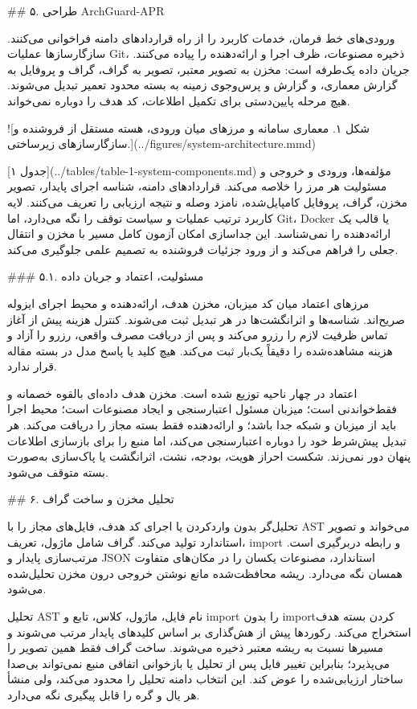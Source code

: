 \documentclass[11pt,a4paper]{article}
\begin{document}
\#\# ۵. طراحی ArchGuard-APR

ورودی‌های خط فرمان، خدمات کاربرد را از راه قراردادهای دامنه فراخوانی می‌کنند. سازگارسازها عملیات Git،
ذخیره مصنوعات، ظرف اجرا و ارائه‌دهنده را پیاده می‌کنند. جریان داده یک‌طرفه است: مخزن به تصویر معتبر،
تصویر به گراف، گراف و پروفایل به گزارش معماری، و گزارش و پرس‌وجوی زمینه به بسته محدود تعمیر تبدیل
می‌شوند. هیچ مرحله پایین‌دستی برای تکمیل اطلاعات، کد هدف را دوباره نمی‌خواند.

![شکل ۱. معماری سامانه و مرزهای میان ورودی، هسته مستقل از فروشنده و سازگارسازهای زیرساختی.](../figures/system-architecture.mmd)

[جدول ۱](../tables/table-1-system-components.md) مؤلفه‌ها، ورودی و خروجی و مسئولیت هر مرز را خلاصه
می‌کند. قراردادهای دامنه، شناسه اجرای پایدار، تصویر مخزن، گراف، پروفایل کامپایل‌شده، نامزد وصله و
نتیجه ارزیابی را تعریف می‌کنند. لایه کاربرد ترتیب عملیات و سیاست توقف را نگه می‌دارد، اما Git، Docker
یا قالب یک ارائه‌دهنده را نمی‌شناسد. این جداسازی امکان آزمون کامل مسیر با مخزن و انتقال جعلی را فراهم
می‌کند و از ورود جزئیات فروشنده به تصمیم علمی جلوگیری می‌کند.

\#\#\# ۵.۱. مسئولیت، اعتماد و جریان داده

مرزهای اعتماد میان کد میزبان، مخزن هدف، ارائه‌دهنده و محیط اجرای ایزوله صریح‌اند. شناسه‌ها و اثرانگشت‌ها
در هر تبدیل ثبت می‌شوند. کنترل هزینه پیش از آغاز تماس ظرفیت لازم را رزرو می‌کند و پس از دریافت مصرف
واقعی، رزرو را آزاد و هزینه مشاهده‌شده را دقیقاً یک‌بار ثبت می‌کند. هیچ کلید یا پاسخ مدل در بسته مقاله
قرار ندارد.

اعتماد در چهار ناحیه توزیع شده است. مخزن هدف داده‌ای بالقوه خصمانه و فقط‌خواندنی است؛ میزبان مسئول
اعتبارسنجی و ایجاد مصنوعات است؛ محیط اجرا باید از میزبان و شبکه جدا باشد؛ و ارائه‌دهنده فقط بسته مجاز
را دریافت می‌کند. هر تبدیل پیش‌شرط خود را دوباره اعتبارسنجی می‌کند، اما منبع را برای بازسازی اطلاعات
پنهان دور نمی‌زند. شکست احراز هویت، بودجه، نشت، اثرانگشت یا پاک‌سازی به‌صورت بسته متوقف می‌شود.

\#\# ۶. تحلیل مخزن و ساخت گراف

تحلیل‌گر بدون واردکردن یا اجرای کد هدف، فایل‌های مجاز را با AST می‌خواند و تصویر استاندارد تولید
می‌کند. گراف شامل ماژول، تعریف، import و رابطه دربرگیری است. مرتب‌سازی پایدار و JSON استاندارد، مصنوعات
یکسان را در مکان‌های متفاوت همسان نگه می‌دارد. ریشه محافظت‌شده مانع نوشتن خروجی درون مخزن تحلیل‌شده
می‌شود.

تحلیل AST نام فایل، ماژول، کلاس، تابع و import را بدون importکردن بسته هدف استخراج می‌کند. رکوردها
پیش از هش‌گذاری بر اساس کلیدهای پایدار مرتب می‌شوند و مسیرها نسبت به ریشه معتبر ذخیره می‌شوند. ساخت
گراف فقط همین تصویر را می‌پذیرد؛ بنابراین تغییر فایل پس از تحلیل یا بازخوانی اتفاقی منبع نمی‌تواند
بی‌صدا ساختار ارزیابی‌شده را عوض کند. این انتخاب دامنه تحلیل را محدود می‌کند، ولی منشأ هر یال و گره
را قابل پیگیری نگه می‌دارد.
\end{document}
